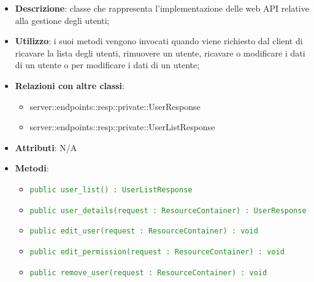     \begin{itemize}
      \item \textbf{Descrizione}: classe che rappresenta l'implementazione delle web API relative alla gestione degli utenti;
      \item \textbf{Utilizzo}: i suoi metodi vengono invocati quando viene richiesto dal client di ricavare la lista degli utenti, rimuovere un utente, ricavare o modificare i dati di un utente o per modificare i dati di un utente;
      \item \textbf{Relazioni con altre classi}:
        \begin{itemize}
          \item server::endpoints::resp::private::UserResponse
          \item server::endpoints::resp::private::UserListResponse
        \end{itemize}
		\item \textbf{Attributi}: N/A
		\item \textbf{Metodi}:
			\begin{itemize}
				\item \textcolor{forestgreen}{\texttt{public user\_list() : UserListResponse}}
				\item \textcolor{forestgreen}{\texttt{public user\_details(request : ResourceContainer) : UserResponse}}
				\item \textcolor{forestgreen}{\texttt{public edit\_user(request : ResourceContainer) : void}}
				\item \textcolor{forestgreen}{\texttt{public edit\_permission(request : ResourceContainer) : void}}
				\item \textcolor{forestgreen}{\texttt{public remove\_user(request : ResourceContainer) : void}}
     	 \end{itemize}
      \end{itemize}
